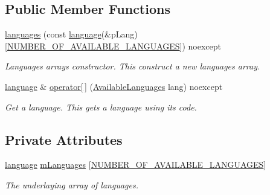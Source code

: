 \subsection*{Public Member Functions}
\begin{DoxyCompactItemize}
\item 
\mbox{\hyperlink{classgame_1_1languages_ac4910ac9ee7bcd69b2e5c2fcc69c25c7}{languages}} (const \mbox{\hyperlink{structgame_1_1languages_1_1language}{language}}(\&p\+Lang)\mbox{[}\mbox{\hyperlink{classgame_1_1languages_ad965ce3a9fdce02ab3caba6301f221ebaf567120d543efe0ddf915638e32eeda2}{N\+U\+M\+B\+E\+R\+\_\+\+O\+F\+\_\+\+A\+V\+A\+I\+L\+A\+B\+L\+E\+\_\+\+L\+A\+N\+G\+U\+A\+G\+ES}}\mbox{]}) noexcept
\begin{DoxyCompactList}\small\item\em Languages\textquotesingle{} array\textquotesingle{}s constructor. This construct a new languages\textquotesingle{} array. \end{DoxyCompactList}\item 
\mbox{\hyperlink{structgame_1_1languages_1_1language}{language}} \& \mbox{\hyperlink{classgame_1_1languages_a8f26423a4e6cc1f3a0a6e386d9129a22}{operator\mbox{[}$\,$\mbox{]}}} (\mbox{\hyperlink{classgame_1_1languages_ad965ce3a9fdce02ab3caba6301f221eb}{Available\+Languages}} lang) noexcept
\begin{DoxyCompactList}\small\item\em Get a language. This gets a language using its code. \end{DoxyCompactList}\end{DoxyCompactItemize}
\subsection*{Private Attributes}
\begin{DoxyCompactItemize}
\item 
\mbox{\label{classgame_1_1languages_ac762ffe06e4c151b7774627a889dc304}} 
\mbox{\hyperlink{structgame_1_1languages_1_1language}{language}} \mbox{\hyperlink{classgame_1_1languages_ac762ffe06e4c151b7774627a889dc304}{m\+Languages}} \mbox{[}\mbox{\hyperlink{classgame_1_1languages_ad965ce3a9fdce02ab3caba6301f221ebaf567120d543efe0ddf915638e32eeda2}{N\+U\+M\+B\+E\+R\+\_\+\+O\+F\+\_\+\+A\+V\+A\+I\+L\+A\+B\+L\+E\+\_\+\+L\+A\+N\+G\+U\+A\+G\+ES}}\mbox{]}
\begin{DoxyCompactList}\small\item\em The underlaying array of languages. \end{DoxyCompactList}\end{DoxyCompactItemize}


